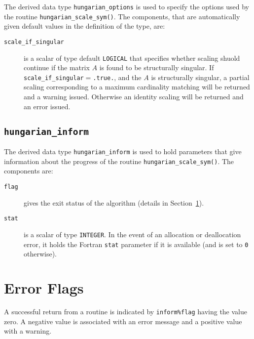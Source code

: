 The derived data type \texttt{hungarian\_options} is used to specify the
options used by the routine \texttt{hungarian\_scale\_sym()}. The components,
that are automatically given default values in the definition of the type, are:

\begin{description}

\item[\texttt{scale\_if\_singular}] is a scalar of type default \texttt{LOGICAL}
that specifies whether scaling shuold continue if the matrix $A$ is found to be
structurally singular. If \texttt{scale\_if\_singular}$=$\texttt{.true.},
and the $A$ is structurally singular, a partial scaling corresponding to a
maximum cardinality matching will be returned and a warning issued. Otherwise
an identity scaling will be returned and an error issued.

\end{description}

\subsection{\texttt{hungarian\_inform}} \label{type:hungarian_inform}

The derived data type \texttt{hungarian\_inform} is used to hold parameters
that give information about the progress of the routine
\texttt{hungarian\_scale\_sym()}. The components are:

\begin{description}

\item[\texttt{flag}] gives the exit status of the algorithm (details in Section~\ref{error flags}).

\item[\texttt{stat}] is a scalar of type \texttt{INTEGER}. In the event of an allocation or deallocation error, it holds the Fortran \texttt{stat} parameter if it is available (and is set to \texttt{0} otherwise).
\end{description}


\section{Error Flags} \label{error flags}
A successful return from a routine is indicated by \texttt{inform\%flag} having the value zero. A negative value is associated with an error message and a positive value with a warning.

